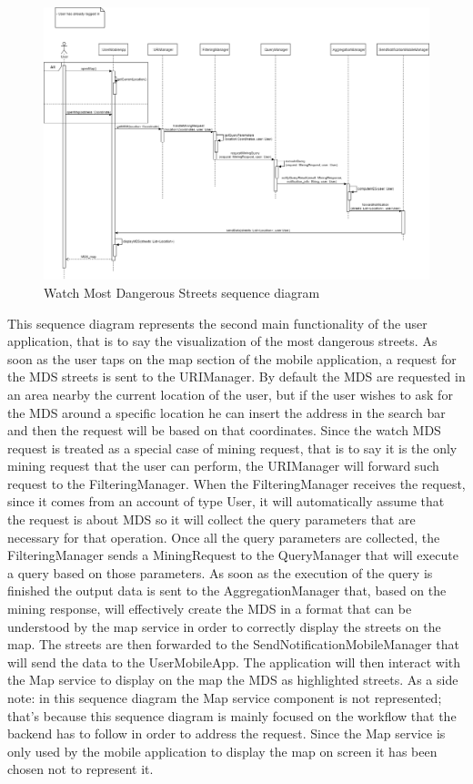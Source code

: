 \begin{figure}[H]
  \centering
  \includegraphics[width=1\textwidth]{Images/UML_diagrams/Sequence_Diagrams/Request_MDS_sd.png}
  \caption{Watch Most Dangerous Streets sequence diagram}
  \label{fig:watch_MDS_sd}
\end{figure}
This sequence diagram represents the second main functionality of the user application, that is to say the visualization of the most dangerous streets. As soon as the user taps on the map section of the mobile application, a request for the MDS streets is sent to the URIManager. By default the MDS are requested in an area nearby the current location of the user, but if the user wishes to ask for the MDS around a specific location he can insert the address in the search bar and then the request will be based on that coordinates. Since the watch MDS request is treated as a special case of mining request, that is to say it is the only mining request that the user can perform, the URIManager will forward such request to the FilteringManager. When the FilteringManager receives the request, since it comes from an account of type User, it will automatically assume that the request is about MDS so it will collect the query parameters that are necessary for that operation.  Once all the query parameters are collected, the FilteringManager sends a MiningRequest to the QueryManager that will execute a query based on those parameters. As soon as the execution of the query is finished the output data is sent to the AggregationManager that, based on the mining response, will effectively create the MDS in a format that can be understood by the map service in order to correctly display the streets on the map. The streets are then forwarded to the SendNotificationMobileManager that will send the data to the UserMobileApp. The application will then interact with the Map service to display on the map the MDS as highlighted streets. As a side note: in this sequence diagram the Map service component is not represented; that's because this sequence diagram is mainly focused on the workflow that the backend has to follow in order to address the request. Since the Map service is only used by the mobile application to display the map on screen it has been chosen not to represent it.
